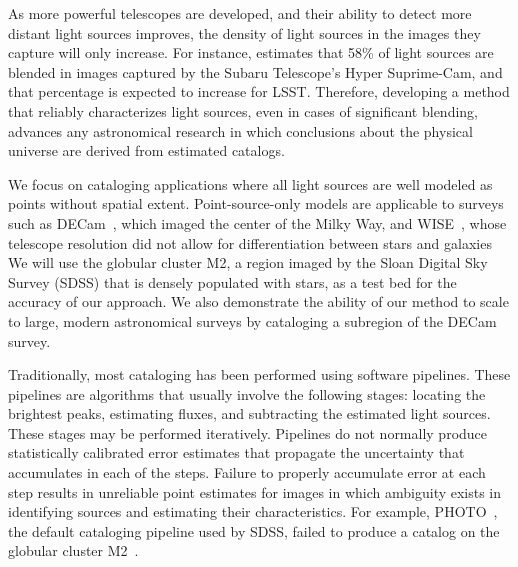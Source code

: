 As more powerful telescopes are developed, and their ability to detect more distant light sources improves,
the density of light sources in the images they capture will only increase.
For instance, \cite{bosch2018hyper} estimates that 58\% of light sources are blended in images captured by the
Subaru Telescope’s Hyper Suprime-Cam, and that percentage is expected to increase for LSST.
Therefore, developing a method that reliably characterizes light sources, even in cases of significant blending,
advances any astronomical research in which conclusions about the physical universe are derived from estimated catalogs.

We focus on cataloging applications where all light sources are well modeled as points without spatial extent.
Point-source-only models are applicable to surveys such as DECam~\citep{Schlafly_2018_DECam},
which imaged the center of the  Milky Way, and WISE~\citep{Wright_2010_WISESurvey},
whose telescope resolution did not allow for differentiation between stars and galaxies
We will use the globular cluster M2, a region imaged by the Sloan Digital Sky Survey (SDSS)
that is densely populated with stars,
as a test bed for the accuracy of our approach.
We also demonstrate the ability of our method to scale to large, modern astronomical surveys
by cataloging a subregion of the DECam survey.

\bigbreak


Traditionally, most cataloging has been performed using software pipelines.
These pipelines are algorithms that usually involve the following stages: locating the brightest peaks, estimating fluxes, and subtracting the estimated light sources.
These stages may be performed iteratively.
Pipelines do not normally produce statistically calibrated error estimates that propagate
the uncertainty that accumulates in each of the steps.
Failure to properly accumulate error at each step results in unreliable point estimates
for images in which ambiguity exists in identifying sources and estimating their characteristics.
For example, PHOTO~\citep{lupton2001sdss}, the default cataloging pipeline used by SDSS, failed to produce a catalog on the globular cluster M2~\citep{Portillo_2017}.


